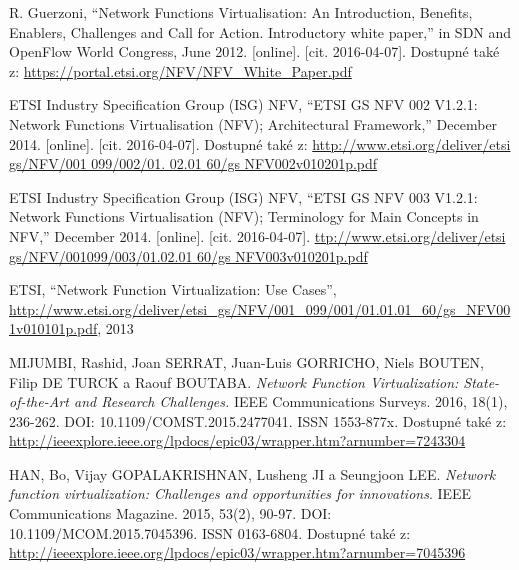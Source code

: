 
 \renewcommand{\appendixname}{Literatura}%

  
\begin{thebibliography}{10}


R. Guerzoni, “Network Functions Virtualisation: An Introduction, Benefits, Enablers, Challenges and Call for Action. Introductory white paper,” in SDN and OpenFlow World Congress, June 2012. [online]. [cit. 2016-04-07]. Dostupné také z: \url{https://portal.etsi.org/NFV/NFV_White_Paper.pdf}


ETSI Industry Specification Group (ISG) NFV, “ETSI GS NFV 002 V1.2.1: Network Functions Virtualisation (NFV); Architectural Framework,” December 2014. [online]. [cit. 2016-04-07]. Dostupné také z: \url{http://www.etsi.org/deliver/etsi gs/NFV/001 099/002/01. 02.01 60/gs NFV002v010201p.pdf} 

ETSI Industry Specification Group (ISG) NFV, “ETSI GS NFV 003 V1.2.1: Network Functions Virtualisation (NFV); Terminology for Main Concepts in NFV,” December 2014. [online]. [cit. 2016-04-07]. \url{ttp://www.etsi.org/deliver/etsi gs/NFV/001099/003/01.02.01 60/gs NFV003v010201p.pdf}

ETSI, “Network Function Virtualization: Use Cases”, \url{http://www.etsi.org/deliver/etsi_gs/NFV/001_099/001/01.01.01_60/gs_NFV001v010101p.pdf}, 2013



MIJUMBI, Rashid, Joan SERRAT, Juan-Luis GORRICHO, Niels BOUTEN, Filip DE TURCK a Raouf BOUTABA. \emph{Network Function Virtualization: State-of-the-Art and Research Challenges.} IEEE Communications Surveys. 2016, 18(1), 236-262. DOI: 10.1109/COMST.2015.2477041. ISSN 1553-877x. Dostupné také z: \url{http://ieeexplore.ieee.org/lpdocs/epic03/wrapper.htm?arnumber=7243304}

HAN, Bo, Vijay GOPALAKRISHNAN, Lusheng JI a Seungjoon LEE. \emph{Network function virtualization: Challenges and opportunities for innovations}. IEEE Communications Magazine. 2015, 53(2), 90-97. DOI: 10.1109/MCOM.2015.7045396. ISSN 0163-6804. Dostupné také z: \url{http://ieeexplore.ieee.org/lpdocs/epic03/wrapper.htm?arnumber=7045396}


\end{thebibliography}
